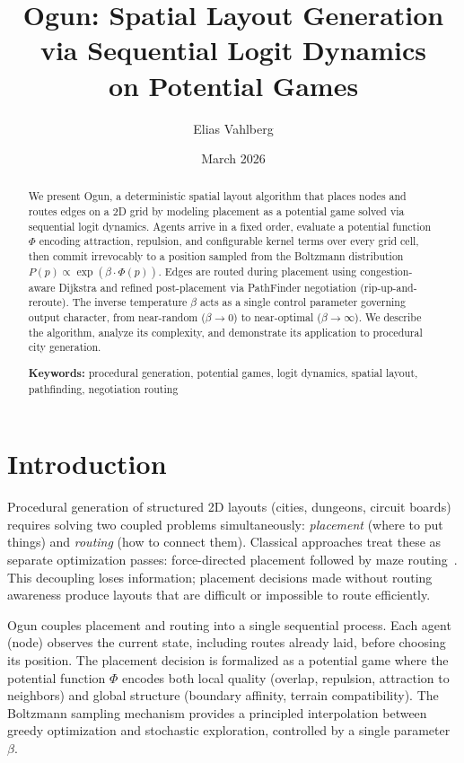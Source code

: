 \documentclass[11pt,a4paper]{article}
\title{Ogun: Spatial Layout Generation via Sequential Logit Dynamics\\on Potential Games}
\author{Elias Vahlberg}
\date{March 2026}
\begin{document}
\maketitle

\begin{abstract}
We present Ogun, a deterministic spatial layout algorithm that places nodes and
routes edges on a 2D grid by modeling placement as a potential game solved via
sequential logit dynamics. Agents arrive in a fixed order, evaluate a potential
function $\Phi$ encoding attraction, repulsion, and configurable kernel terms
over every grid cell, then commit irrevocably to a position sampled from the
Boltzmann distribution $P(p) \propto \exp(\beta \cdot \Phi(p))$. Edges are
routed during placement using congestion-aware Dijkstra and refined
post-placement via PathFinder negotiation (rip-up-and-reroute). The inverse
temperature $\beta$ acts as a single control parameter governing output
character, from near-random ($\beta \to 0$) to near-optimal ($\beta \to
\infty$). We describe the algorithm, analyze its complexity, and demonstrate its
application to procedural city generation.

\medskip
\noindent\textbf{Keywords:} procedural generation, potential games, logit
dynamics, spatial layout, pathfinding, negotiation routing
\end{abstract}

\section{Introduction}

Procedural generation of structured 2D layouts (cities, dungeons, circuit
boards) requires solving two coupled problems simultaneously: \emph{placement}
(where to put things) and \emph{routing} (how to connect them). Classical
approaches treat these as separate optimization passes: force-directed placement
followed by maze routing~\cite{mcmurchie1995}. This decoupling loses
information; placement decisions made without routing awareness produce layouts
that are difficult or impossible to route efficiently.

Ogun couples placement and routing into a single sequential process. Each agent
(node) observes the current state, including routes already laid, before
choosing its position. The placement decision is formalized as a potential game
where the potential function $\Phi$ encodes both local quality (overlap,
repulsion, attraction to neighbors) and global structure (boundary affinity,
terrain compatibility). The Boltzmann sampling mechanism provides a principled
interpolation between greedy optimization and stochastic exploration, controlled
by a single parameter $\beta$.
\end{document}
